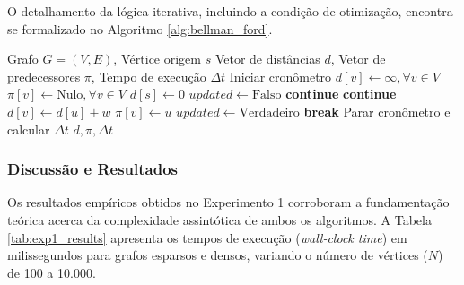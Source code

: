 \documentclass[10pt,a4paper]{article}
\begin{document}
O detalhamento da lógica iterativa, incluindo a condição de otimização, encontra-se formalizado no Algoritmo \ref{alg:bellman_ford}.

\begin{algorithm}[H]
\caption{Algoritmo de Bellman-Ford (com \textit{Early Stopping})}\label{alg:bellman_ford}
\begin{algorithmic}[1]
\Require Grafo $G = (V, E)$, Vértice origem $s$
\Ensure Vetor de distâncias $d$, Vetor de predecessores $\pi$, Tempo de execução $\Delta t$
\State Iniciar cronômetro
\State $d[v] \gets \infty, \forall v \in V$
\State $\pi[v] \gets \text{Nulo}, \forall v \in V$
\State $d[s] \gets 0$
    \State $updated \gets \text{Falso}$
            \State \textbf{continue}
        \EndIf
             
                \State \textbf{continue}
            \EndIf
                \State $d[v] \gets d[u] + w$
                \State $\pi[v] \gets u$
                \State $updated \gets \text{Verdadeiro}$
            \EndIf
        \EndFor
    \EndFor
        \State \textbf{break} 
    \EndIf
\EndFor
\State Parar cronômetro e calcular $\Delta t$
\State \Return $d, \pi, \Delta t$
\end{algorithmic}
\end{algorithm}

\subsubsection{Discussão e Resultados}

Os resultados empíricos obtidos no Experimento 1 corroboram a fundamentação teórica acerca da complexidade assintótica de ambos os algoritmos. A Tabela \ref{tab:exp1_results} apresenta os tempos de execução (\textit{wall-clock time}) em milissegundos para grafos esparsos e densos, variando o número de vértices ($N$) de 100 a 10.000.
\end{document}
